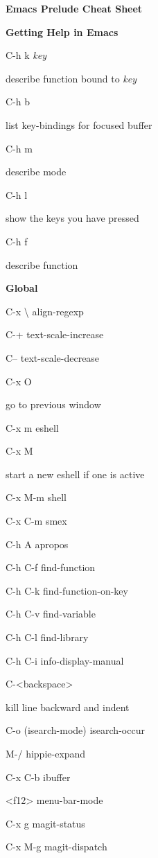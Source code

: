 \documentclass[10pt]{article}
\renewcommand\section[1]{\bigskip\par\textbf{\color{heading}\large#1}\smallskip}
\newcommand\humanreadable[1]{{\par\color{default}\small\sffamily#1}}
\newcommand\meta[1]{\textlangle\textit{#1}\textrangle}
\begin{document}
\begin{multicols}{4}

  \setlength{\columnsep}{1cm}
  \begin{center}
    \LARGE\color{heading}\textbf{Emacs Prelude Cheat Sheet}
  \end{center}

  \section{Getting Help in Emacs}
  \begin{keylist}
  \item[C-h k \meta{key}] \humanreadable{describe function bound to \meta{key}}
  \item[C-h b] \humanreadable{list key-bindings for focused buffer}
  \item[C-h m] \humanreadable{describe mode}
  \item[C-h l] \humanreadable{show the keys you have pressed}
  \item[C-h f] \humanreadable{describe function}
  \end{keylist}

  \section{Global}
  \begin{keylist}
  \item[C-x \textbackslash] align-regexp
  \item[C-+] text-scale-increase
  \item[C--] text-scale-decrease
  \item[C-x O] \humanreadable{go to previous window}
  \item[C-x m] eshell
  \item[C-x M] \humanreadable{start a new eshell if one is active}
  \item[C-x M-m] shell
  \item[C-x C-m] smex
  \item[C-h A] apropos
  \item[C-h C-f] find-function
  \item[C-h C-k] find-function-on-key
  \item[C-h C-v] find-variable
  \item[C-h C-l] find-library
  \item[C-h C-i] info-display-manual
  \item[C-<backspace>] \humanreadable{kill line backward and indent}
  \item[C-o] (isearch-mode) isearch-occur
  \item[M-/] hippie-expand
  \item[C-x C-b] ibuffer
  \item[<f12>] menu-bar-mode
  \item[C-x g] magit-status
  \item[C-x M-g] magit-dispatch
  \end{keylist}


\end{multicols}
\end{document}
